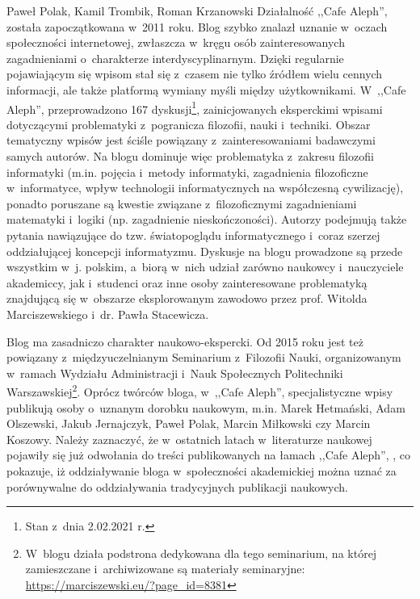 \begin{newrevplenv}{Paweł Polak, Kamil Trombik, Roman Krzanowski}
Działalność ,,Cafe Aleph'', została zapoczątkowana w~2011 roku. Blog szybko znalazł uznanie w~oczach społeczności internetowej, zwłaszcza w~kręgu osób zainteresowanych zagadnieniami o~charakterze interdyscyplinarnym. Dzięki regularnie pojawiającym się wpisom stał się z~czasem nie tylko źródłem wielu cennych informacji, ale także platformą wymiany myśli między użytkownikami. W~,,Cafe Aleph'', przeprowadzono 167 dyskusji\footnote{Stan z~dnia 2.02.2021 r.}, zainicjowanych eksperckimi wpisami dotyczącymi problematyki z~pogranicza filozofii, nauki i~techniki. Obszar tematyczny wpisów jest ściśle powiązany z~zainteresowaniami badawczymi samych autorów. Na blogu dominuje więc problematyka z~zakresu filozofii informatyki (m.in. pojęcia i~metody informatyki, zagadnienia filozoficzne w~informatyce, wpływ technologii informatycznych na współczesną cywilizację), ponadto poruszane są kwestie związane z~filozoficznymi zagadnieniami matematyki i~logiki (np. zagadnienie nieskończoności). Autorzy podejmują także pytania nawiązujące do tzw. światopoglądu informatycznego i~coraz szerzej oddziałującej koncepcji informatyzmu. Dyskusje na blogu prowadzone są przede wszystkim w~j. polskim, a~biorą w~nich udział zarówno naukowcy i~nauczyciele akademiccy, jak i~studenci oraz inne osoby zainteresowane problematyką znajdującą się w~obszarze eksplorowanym zawodowo przez prof. Witolda Marciszewskiego i~dr. Pawła Stacewicza.

Blog ma zasadniczo charakter naukowo-ekspercki. Od 2015 roku jest też powiązany z~międzyuczelnianym Seminarium z~Filozofii Nauki, organizowanym w~ramach Wydziału Administracji i~Nauk Społecznych Politechniki Warszawskiej\footnote{W~blogu działa podstrona dedykowana dla tego seminarium, na której zamieszczane i~archiwizowane są materiały seminaryjne: \url{https://marciszewski.eu/?page_id=8381}}. Oprócz twórców bloga, w~,,Cafe Aleph'', specjalistyczne wpisy publikują osoby o~uznanym dorobku naukowym, m.in. Marek Hetmański, Adam Olszewski, Jakub Jernajczyk, Paweł Polak, Marcin Miłkowski czy Marcin Koszowy. Należy zaznaczyć, że w~ostatnich latach w~literaturze naukowej pojawiły się już odwołania do treści publikowanych na łamach ,,Cafe Aleph'',
\parencites[zob. np.][]{Sokół2014}{polak_czy_2017}{sarosiek_biologiczne_2016}, %
co pokazuje, iż oddziaływanie bloga w~społeczności akademickiej można uznać za porównywalne do oddziaływania tradycyjnych publikacji naukowych.


\end{newrevplenv}
